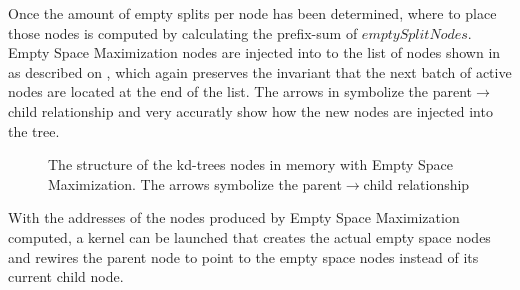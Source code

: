 Once the amount of empty splits per node has been determined, where to place
those nodes is computed by calculating the prefix-sum of
$emptySplitNodes$. Empty Space Maximization nodes are injected into to the list
of nodes shown in  as described on
, which again preserves the invariant that the
next batch of active nodes are located at the end of the list. The arrows in
 symbolize the parent$\rightarrow$child
relationship and very accuratly show how the new nodes are injected into the
tree.

\begin{figure}
  \centering
  \caption[The structure of the kd-trees nodes in memory with Empty Space
    Maximization.]{The structure of the kd-trees nodes in memory with Empty
    Space Maximization. The arrows symbolize the parent$\rightarrow$child
    relationship}
  \label{fig:emptyNodeStructure}
\end{figure}



With the addresses of the nodes produced by Empty Space Maximization computed, a
kernel can be launched that creates the actual empty space nodes and rewires the
parent node to point to the empty space nodes instead of its current child node.

